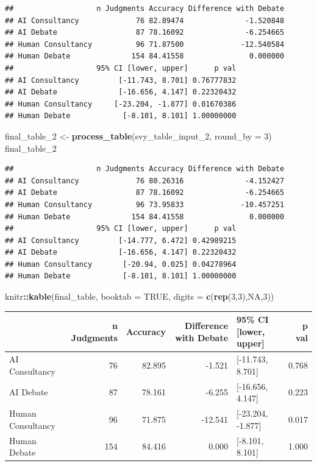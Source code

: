\documentclass[
]{article}
\newenvironment{Shaded}{\begin{snugshade}}{\end{snugshade}}
\newcommand{\AttributeTok}[1]{\textcolor[rgb]{0.13,0.29,0.53}{#1}}
\newcommand{\ConstantTok}[1]{\textcolor[rgb]{0.56,0.35,0.01}{#1}}
\newcommand{\DecValTok}[1]{\textcolor[rgb]{0.00,0.00,0.81}{#1}}
\newcommand{\FunctionTok}[1]{\textcolor[rgb]{0.13,0.29,0.53}{\textbf{#1}}}
\newcommand{\NormalTok}[1]{#1}
\newcommand{\OtherTok}[1]{\textcolor[rgb]{0.56,0.35,0.01}{#1}}
\newcommand{\SpecialCharTok}[1]{\textcolor[rgb]{0.81,0.36,0.00}{\textbf{#1}}}
\begin{document}
\begin{verbatim}
##                   n Judgments Accuracy Difference with Debate
## AI Consultancy             76 82.89474              -1.520848
## AI Debate                  87 78.16092              -6.254665
## Human Consultancy          96 71.87500             -12.540584
## Human Debate              154 84.41558               0.000000
##                   95% CI [lower, upper]      p val
## AI Consultancy         [-11.743, 8.701] 0.76777832
## AI Debate              [-16.656, 4.147] 0.22320432
## Human Consultancy     [-23.204, -1.877] 0.01670386
## Human Debate            [-8.101, 8.101] 1.00000000
\end{verbatim}

\begin{Shaded}
\begin{Highlighting}[]
\NormalTok{final\_table\_2 }\OtherTok{\textless{}{-}} \FunctionTok{process\_table}\NormalTok{(svy\_table\_input\_2, }\AttributeTok{round\_by =} \DecValTok{3}\NormalTok{)}
\NormalTok{final\_table\_2}
\end{Highlighting}
\end{Shaded}

\begin{verbatim}
##                   n Judgments Accuracy Difference with Debate
## AI Consultancy             76 80.26316              -4.152427
## AI Debate                  87 78.16092              -6.254665
## Human Consultancy          96 73.95833             -10.457251
## Human Debate              154 84.41558               0.000000
##                   95% CI [lower, upper]      p val
## AI Consultancy         [-14.777, 6.472] 0.42989215
## AI Debate              [-16.656, 4.147] 0.22320432
## Human Consultancy       [-20.94, 0.025] 0.04278964
## Human Debate            [-8.101, 8.101] 1.00000000
\end{verbatim}

\begin{Shaded}
\begin{Highlighting}[]
\NormalTok{knitr}\SpecialCharTok{::}\FunctionTok{kable}\NormalTok{(final\_table, }\AttributeTok{booktab =} \ConstantTok{TRUE}\NormalTok{, }\AttributeTok{digits =} \FunctionTok{c}\NormalTok{(}\FunctionTok{rep}\NormalTok{(}\DecValTok{3}\NormalTok{,}\DecValTok{3}\NormalTok{),}\ConstantTok{NA}\NormalTok{,}\DecValTok{3}\NormalTok{))}
\end{Highlighting}
\end{Shaded}

\begin{tabular}{lrrrlr}
\toprule
  & n Judgments & Accuracy & Difference with Debate & 95\% CI [lower, upper] & p val\\
\midrule
AI Consultancy & 76 & 82.895 & -1.521 & {}[-11.743, 8.701] & 0.768\\
AI Debate & 87 & 78.161 & -6.255 & {}[-16.656, 4.147] & 0.223\\
Human Consultancy & 96 & 71.875 & -12.541 & {}[-23.204, -1.877] & 0.017\\
Human Debate & 154 & 84.416 & 0.000 & {}[-8.101, 8.101] & 1.000\\
\bottomrule
\end{tabular}
\end{document}
